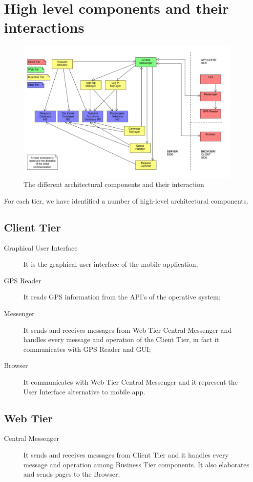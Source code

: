 \section{High level components and their interactions}
\label{sec:architecture}
\begin{figure}
\centering
\includegraphics[width=\textwidth]{tex-images/interactions}
\caption{The different architectural components and their interaction}
\end{figure}

For each tier, we have identified a number of high-level architectural components.
\subsection{Client Tier}
\begin{description}
\item[Graphical User Interface] It is the graphical user interface of the mobile application;
\item[GPS Reader] It reads GPS information from the API's of the operative system;
\item[Messenger] It sends and receives messages from Web Tier Central Messenger and handles every message and operation of the Client Tier, in fact it communicates with GPS Reader and GUI;
\item[Browser] It communicates with Web Tier Central Messenger and it represent the User Interface alternative to mobile app.
\end{description}

\subsection{Web Tier}
\begin{description}
\item[Central Messenger] It sends and receives messages from Client Tier and it handles every message and operation among Business Tier components. It also elaborates and sends pages to the Browser;
\end{description}


